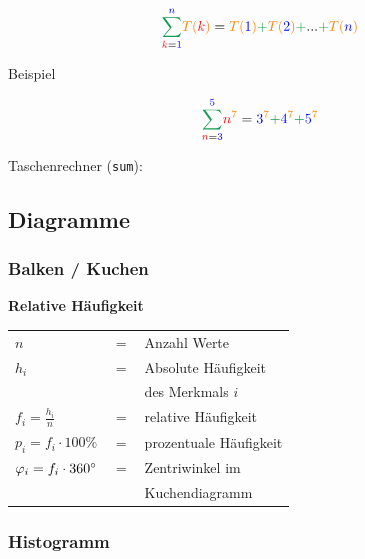 \begin{multicols}{2}
  $${\color{ForestGreen}\sum_{{\color{red}k}{{\color{ForestGreen}{\color{black}=}\color{blue}1}}}^{\color{blue}n\color{ForestGreen}}}
  {\color{orange}T(}{{\color{red}k}}{\color{orange})} = {\color{orange}T(}{\color{blue}1}{\color{orange})} {\color{ForestGreen}+} {\color{orange}T(}{\color{blue}2}{\color{orange})} {\color{ForestGreen}+}
  ... {\color{ForestGreen}+} {\color{orange}T(}{\color{blue}n}{\color{orange})}$$

Beispiel

  $${\color{ForestGreen}\sum_{{\color{red}n}{{\color{ForestGreen}{\color{black}=}\color{blue}3}}}^{\color{blue}5\color{ForestGreen}}}  {\color{red}n}^{{\color{orange}7}} = {\color{blue}3}^{\color{orange}7} {\color{ForestGreen}+} {\color{blue}4}^{\color{orange}7} {\color{ForestGreen}+} {\color{blue}5}^{\color{orange}7}$$


Taschenrechner (\texttt{sum}): 




\subsection*{Diagramme}
\subsubsection*{Balken / Kuchen}
\begin{tcolorbox}[colback=white]
  \textbf{Relative Häufigkeit}\\
\begin{tabular}{lcl}
$n$   &$=$& Anzahl Werte\\
$h_i$ &$=$& Absolute Häufigkeit\\
      & & des Merkmals $i$\\
$f_i = \frac{h_i}n$ &$=$& relative Häufigkeit\\
$p_i = f_i\cdot{}100\%$ &$=$& prozentuale Häufigkeit\\
$\varphi_i = f_i\cdot{}360^\circ$ &$=$& Zentriwinkel im\\
      & &Kuchendiagramm
  \end{tabular}
\end{tcolorbox}



\subsubsection*{Histogramm}


\end{multicols}
